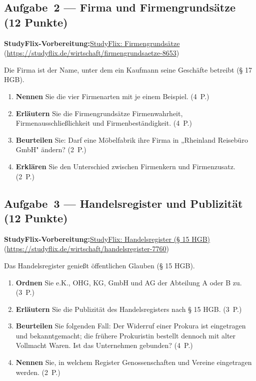 \documentclass[11pt, a4paper]{article}
\begin{document}
\subsection*{Aufgabe~2 --- Firma und Firmengrundsätze (12 Punkte)}

\noindent\textbf{\color{bfwAccent}StudyFlix-Vorbereitung:}\enspace \href{https://studyflix.de/wirtschaft/firmengrundsaetze-8653}{StudyFlix: Firmengrundsätze} (\url{https://studyflix.de/wirtschaft/firmengrundsaetze-8653})

\medskip
Die Firma ist der Name, unter dem ein Kaufmann seine Geschäfte betreibt (§ 17 HGB).

\begin{enumerate}[label=(\alph*)]
  \item \textbf{Nennen} Sie die vier Firmenarten mit je einem Beispiel. \hfill (4~P.)
  \item \textbf{Erläutern} Sie die Firmengrundsätze Firmenwahrheit, Firmenausschließlichkeit und Firmenbeständigkeit. \hfill (4~P.)
  \item \textbf{Beurteilen} Sie: Darf eine Möbelfabrik ihre Firma in „Rheinland Reisebüro GmbH" ändern? \hfill (2~P.)
  \item \textbf{Erklären} Sie den Unterschied zwischen Firmenkern und Firmenzusatz. \hfill (2~P.)
\end{enumerate}

\subsection*{Aufgabe~3 --- Handelsregister und Publizität (12 Punkte)}

\noindent\textbf{\color{bfwAccent}StudyFlix-Vorbereitung:}\enspace \href{https://studyflix.de/wirtschaft/handelsregister-7760}{StudyFlix: Handelsregister (§ 15 HGB)} (\url{https://studyflix.de/wirtschaft/handelsregister-7760})

\medskip
Das Handelsregister genießt öffentlichen Glauben (§ 15 HGB).

\begin{enumerate}[label=(\alph*)]
  \item \textbf{Ordnen} Sie e.K., OHG, KG, GmbH und AG der Abteilung A oder B zu. \hfill (3~P.)
  \item \textbf{Erläutern} Sie die Publizität des Handelsregisters nach § 15 HGB. \hfill (3~P.)
  \item \textbf{Beurteilen} Sie folgenden Fall: Der Widerruf einer Prokura ist eingetragen und bekanntgemacht; die frühere Prokuristin bestellt dennoch mit alter Vollmacht Waren. Ist das Unternehmen gebunden? \hfill (4~P.)
  \item \textbf{Nennen} Sie, in welchem Register Genossenschaften und Vereine eingetragen werden. \hfill (2~P.)
\end{enumerate}
\end{document}
